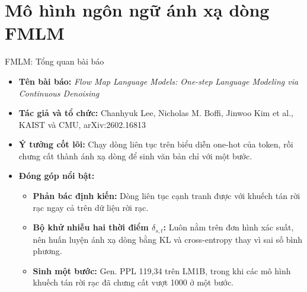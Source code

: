 
\section{Mô hình ngôn ngữ ánh xạ dòng FMLM}

\begin{frame}{FMLM: Tổng quan bài báo}
    \begin{itemize}
        \item \textbf{Tên bài báo:} \textit{Flow Map Language Models: One-step Language Modeling via Continuous Denoising}
        \item \textbf{Tác giả và tổ chức:} Chanhyuk Lee, Nicholas M. Boffi, Jinwoo Kim et al., KAIST và CMU, arXiv:2602.16813
        \item \textbf{Ý tưởng cốt lõi:} Chạy dòng liên tục trên biểu diễn one-hot của token, rồi chưng cất thành ánh xạ dòng để sinh văn bản chỉ với một bước.
        \item \textbf{Đóng góp nổi bật:}
        \begin{itemize}
            \item \textbf{Phản bác định kiến:} Dòng liên tục cạnh tranh được với khuếch tán rời rạc ngay cả trên dữ liệu rời rạc.
            \item \textbf{Bộ khử nhiễu hai thời điểm $\delta_{s,t}$:} Luôn nằm trên đơn hình xác suất, nên huấn luyện ánh xạ dòng bằng KL và cross-entropy thay vì sai số bình phương.
            \item \textbf{Sinh một bước:} Gen. PPL 119,34 trên LM1B, trong khi các mô hình khuếch tán rời rạc đã chưng cất vượt 1000 ở một bước.
        \end{itemize}
    \end{itemize}
\end{frame}

